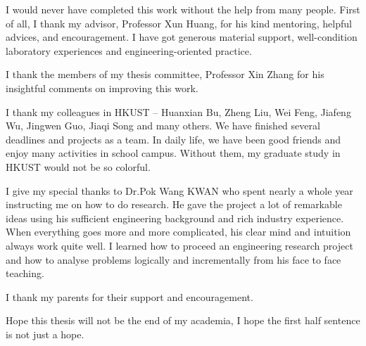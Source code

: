 \acknowledgments
I would never have completed this work without the help from many people. First of all, I thank my advisor, Professor Xun Huang, for his kind mentoring, helpful advices, and encouragement. I have got generous material support, well-condition laboratory experiences and engineering-oriented practice.  

I thank the members of my thesis committee, Professor Xin Zhang for his insightful comments on improving this work. 

I thank my colleagues in HKUST -- Huanxian Bu, Zheng Liu, Wei Feng, Jiafeng Wu, Jingwen Guo, Jiaqi Song and many others. We have finished several deadlines and projects as a team. In daily life, we have been good friends and enjoy many activities in school campus. Without them, my graduate study in HKUST would not be so colorful. 

I give my special thanks to Dr.Pok Wang KWAN who spent nearly a whole year instructing me on how to do research. He gave the project a lot of remarkable ideas using his sufficient engineering background and rich industry experience. When everything goes more and more complicated, his clear mind and intuition always work quite well. I learned how to proceed an engineering research project and how to analyse problems logically and incrementally from his face to face teaching.   

I thank my parents for their support and encouragement. 

Hope this thesis will not be the end of my academia, I hope the first half sentence is not just a hope.

\endacknowledgments
